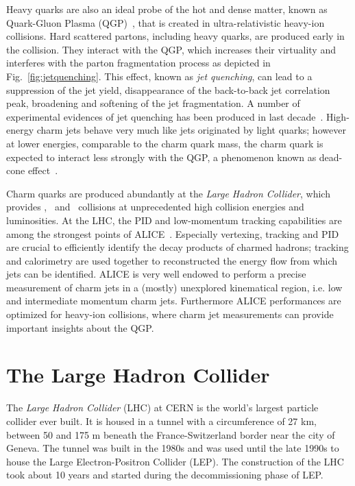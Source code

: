 \documentclass[12pt, a4paper, twoside, titlepage]{article}
\begin{document}
Heavy quarks are also an ideal probe of the hot and dense matter, known as Quark-Gluon Plasma (QGP)~\cite{STAR:2005a, PHENIX:2005a, ALICE:2010b, ALICE:2011b, CMS:2013d, ATLAS:2013c}, 
that is created in ultra-relativistic heavy-ion collisions. 
Hard scattered partons, including heavy quarks, are produced early in the collision. They interact with the QGP, which increases their virtuality and interferes with the
parton fragmentation process as depicted in Fig.~\ref{fig:jetquenching}. 
This effect, known as \emph{jet quenching}, can lead to a suppression of the jet yield, disappearance of the back-to-back jet correlation peak,
broadening and softening of the jet fragmentation. 
A number of experimental evidences of jet quenching has been produced in last decade~\cite{ALICE:2010d, CMS:2011c, CMS:2012b, ATLAS:2014d, ALICE:2015a}.
High-energy charm jets behave very much like jets originated by light quarks; however at lower energies, comparable to the charm quark mass, the charm quark is expected
to interact less strongly with the QGP, a phenomenon known as dead-cone effect~\cite{Dokshitzer:2001}.

Charm quarks are produced abundantly at the \emph{Large Hadron Collider}, which provides \pp, \pPb\ and \PbPb\ collisions at unprecedented high collision energies and luminosities.
At the LHC, the PID and low-momentum tracking capabilities are among the strongest points of ALICE~\cite{ALICE:2014b}.
Especially vertexing, tracking and PID are crucial to efficiently identify the decay products of charmed hadrons; tracking and calorimetry are used together to reconstructed the energy flow from which jets can be identified.
ALICE is very well endowed to perform a precise measurement of charm jets in a (mostly) unexplored kinematical region, i.e. low and intermediate momentum charm jets. Furthermore ALICE performances
are optimized for heavy-ion collisions, where charm jet measurements can provide important insights about the QGP.

\section{The Large Hadron Collider}
The \emph{Large Hadron Collider} (LHC) at CERN is the world's largest particle collider ever built.
It is housed in a tunnel with a circumference of 27 km, between 50 and 175 m beneath
the France-Switzerland border near the city of Geneva. The tunnel was built in the 1980s and was used until 
the late 1990s to house the Large Electron-Positron Collider (LEP). The construction of the LHC took about 10 years and started
during the decommissioning phase of LEP. 
\end{document}

